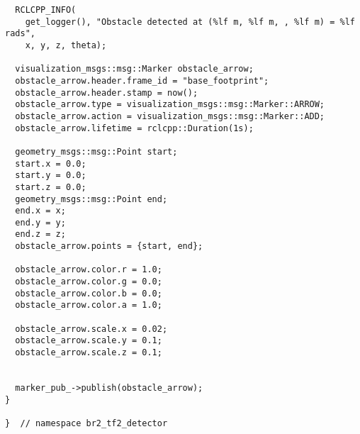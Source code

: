 \begin{tcolorbox}[sharp corners, colframe=gray!80, colback=LightGray, left=0pt, top=0pt, bottom=0pt, title=\texttt{br2\_tf2\_detector/src/br2\_tf2\_detector/ObstacleMonitorNode.cpp}]
\begin{verbatim}
  RCLCPP_INFO(
    get_logger(), "Obstacle detected at (%lf m, %lf m, , %lf m) = %lf rads",
    x, y, z, theta);

  visualization_msgs::msg::Marker obstacle_arrow;
  obstacle_arrow.header.frame_id = "base_footprint";
  obstacle_arrow.header.stamp = now();
  obstacle_arrow.type = visualization_msgs::msg::Marker::ARROW;
  obstacle_arrow.action = visualization_msgs::msg::Marker::ADD;
  obstacle_arrow.lifetime = rclcpp::Duration(1s);

  geometry_msgs::msg::Point start;
  start.x = 0.0;
  start.y = 0.0;
  start.z = 0.0;
  geometry_msgs::msg::Point end;
  end.x = x;
  end.y = y;
  end.z = z;
  obstacle_arrow.points = {start, end};

  obstacle_arrow.color.r = 1.0;
  obstacle_arrow.color.g = 0.0;
  obstacle_arrow.color.b = 0.0;
  obstacle_arrow.color.a = 1.0;

  obstacle_arrow.scale.x = 0.02;
  obstacle_arrow.scale.y = 0.1;
  obstacle_arrow.scale.z = 0.1;


  marker_pub_->publish(obstacle_arrow);
}

}  // namespace br2_tf2_detector
    \end{verbatim}
    \end{tcolorbox}
  \normalsize

